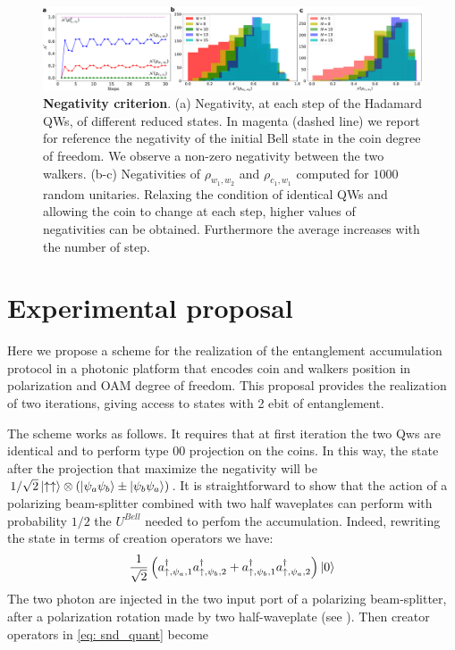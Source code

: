 \documentclass[
	aps, pra,
	superscriptaddress, twocolumn,
	floatfix,
	10pt
]{revtex4-1}
\newcommand{\parTitle}[1]{\noindent{\color{Mahogany}(\emph{#1})}}
\begin{document}
\parTitle{What did we conclude from this?}

\begin{figure}[hbt]
    \centering
    \includegraphics[width=\textwidth]{negs+rand.pdf}
    \caption{\textbf{Negativity criterion}.
    (a) Negativity, at each step of the Hadamard QWs, of different reduced states.
    In magenta (dashed line) we report for reference the negativity of the initial Bell state in the coin degree of freedom.
    We observe a non-zero negativity between the two walkers. (b-c) Negativities of $\rho_{w_1, w_2}$ and $\rho_{c_1, w_1}$ computed for $1000$ random unitaries. Relaxing the condition of identical QWs and allowing the coin to change at each step, higher values of negativities can be obtained. Furthermore the average increases with the number of step.}
    \label{fig:neg_trace}
\end{figure}



\section{Experimental proposal}
Here we propose a scheme for the realization of the entanglement accumulation protocol in a photonic platform that encodes coin and walkers position in polarization and OAM degree of freedom. This proposal provides the realization of two iterations, giving access to states with 2 ebit of entanglement. 

The scheme works as follows. It requires that at first iteration the two Qws are identical and to perform type 00 projection on the coins. In this way, the state after the projection that maximize the negativity will be $1/\sqrt{2}\ket{\uparrow \uparrow}\otimes(\ket{\psi_a\psi_b}\pm\ket{\psi_b\psi_a})$. 
It is straightforward to show that the action of a polarizing beam-splitter combined with two half waveplates can perform with probability $1/2$ the $U^{Bell}$ needed to perfom the accumulation.
Indeed, rewriting the state in terms of creation operators we have:
\begin{equation}
    \frac{1}{\sqrt{2}}\left(a^{\dagger}_{\uparrow, \psi_a,1}a^{\dagger}_{\uparrow, \psi_b,2}+a^{\dagger}_{\uparrow, \psi_b,1}a^{\dagger}_{\uparrow, \psi_a,2} \right)\ket{0} 
    \label{eq: snd_quant}
\end{equation}
The two photon are injected in the two input port of a polarizing beam-splitter, after a polarization rotation made by two half-waveplate (see ). Then creator operators in \cref{eq: snd_quant} become
\end{document}
